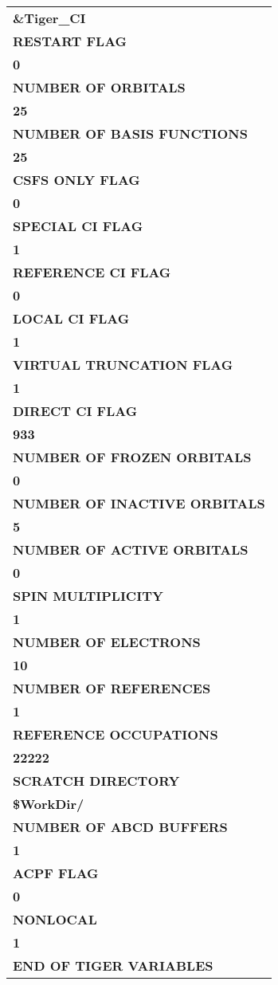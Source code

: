 \documentclass{article}
\begin{document}
\begin{figure}[h!]
	\begin{tabular}{l}
		\textbf{\&Tiger\_CI}  \\
		\textbf{RESTART FLAG } \\
		\textbf{0 } \\
		\textbf{NUMBER OF ORBITALS } \\
		\textbf{25 } \\
		\textbf{NUMBER OF BASIS FUNCTIONS } \\
		\textbf{25 } \\
		\textbf{CSFS ONLY FLAG } \\
		\textbf{0 } \\
		\textbf{SPECIAL CI FLAG } \\
		\textbf{1 } \\
		\textbf{REFERENCE CI FLAG } \\
		\textbf{0 } \\
		\textbf{LOCAL CI FLAG } \\
		\textbf{1} \\
		\textbf{VIRTUAL TRUNCATION FLAG } \\
		\textbf{1 } \\
		\textbf{DIRECT CI FLAG } \\
		\textbf{933 } \\
		\textbf{NUMBER OF FROZEN ORBITALS } \\
		\textbf{0 } \\
		\textbf{NUMBER OF INACTIVE ORBITALS} \\
		\textbf{5 } \\
		\textbf{NUMBER OF ACTIVE ORBITALS } \\
		\textbf{0 } \\
		\textbf{SPIN MULTIPLICITY } \\
		\textbf{1 } \\
		\textbf{NUMBER OF ELECTRONS } \\
		\textbf{10 } \\
		\textbf{NUMBER OF REFERENCES } \\
		\textbf{1 } \\
		\textbf{REFERENCE OCCUPATIONS } \\
		\textbf{22222 } \\
		\textbf{SCRATCH DIRECTORY } \\
		\textbf{\$WorkDir/ } \\
		\textbf{NUMBER OF ABCD BUFFERS } \\
		\textbf{1 } \\
		\textbf{ACPF FLAG } \\
		\textbf{0 } \\
		\textbf{NONLOCAL } \\
		\textbf{1} \\
		\textbf{END OF TIGER VARIABLES } \\	
	\end{tabular}
	\centering
\end{figure}
\end{document}
